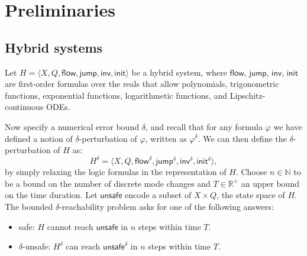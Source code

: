 \section{Preliminaries}
\subsection{Hybrid systems}
Let $H = \langle X, Q, \mathsf{flow}, \mathsf{jump},
\mathsf{inv},\mathsf{init}\rangle$ be a hybrid system, where
$\mathsf{flow}$, $\mathsf{jump}$, $\mathsf{inv}$, $\mathsf{init}$ are
first-order formulas over the reals that allow polynomials,
trigonometric functions, exponential functions, logarithmetic
functions, and Lipschitz-continuous ODEs.

Now specify a numerical error bound $\delta$, and recall that for any
formula $\varphi$ we have defined a notion of $\delta$-perturbation of
$\varphi$, written as $\varphi^{\delta}$. We can then define the
$\delta$-perturbation of $H$ as:
\[
H^{\delta} = \langle X, Q, {\mathsf{flow}}^{\delta},
{\mathsf{jump}}^{\delta}, {\mathsf{inv}}^{\delta},
{\mathsf{init}}^{\delta}\rangle,
\]
by simply relaxing the logic formulas in the representation of $H$.
Choose $n\in\mathbb{N}$ to be a bound on the number of discrete mode
changes and $T\in \mathbb{R}^+$ an upper bound on the time duration.
Let $\mathsf{unsafe}$ encode a subset of $X\times Q$, the state space
of $H$. The bounded $\delta$-reachability problem asks for one of the
following answers:

\begin{itemize}
\item  safe: $H$ cannot reach $\mathsf{unsafe}$ in $n$ steps within
  time $T$.
\item $\delta$-unsafe: $H^{\delta}$ can reach ${\mathsf{unsafe}}^{\delta}$ in $n$ steps within time $T$.
\end{itemize}

